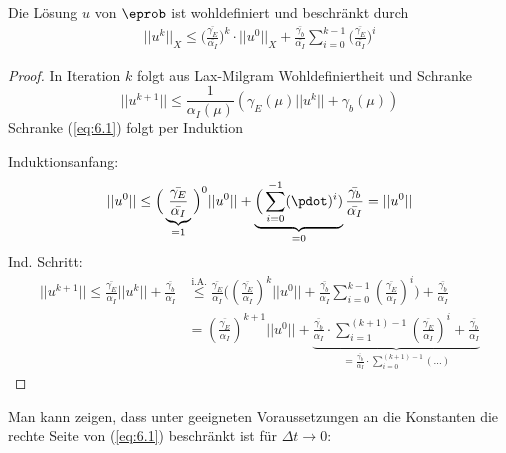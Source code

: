 \begin{satz} \label{6.2}
Die Lösung $u$ von $\eprob$ ist wohldefiniert und beschränkt durch
\begin{align} \label{eq:6.1}
||u^k||_X \leq \Big(\frac{\bar{\gamma_E}}{\bar{\alpha_I}}\Big)^k \cdot ||u^0||_X + \frac{\bar{\gamma_b}}{\bar{\alpha_I}} \sum\limits_{i=0}^{k-1} \Big(\frac{\bar{\gamma_E}}{\bar{\alpha_I}}\Big)^i
\end{align}
\begin{proof}
In Iteration $k$ folgt aus Lax-Milgram Wohldefiniertheit und Schranke
\[
	||u^{k+1}|| \leq \frac{1}{\alpha_I(\mu)} (\gamma_E(\mu)||u^k|| + \gamma_b(\mu))
\]
Schranke (\ref{eq:6.1}) folgt per Induktion

Induktionsanfang:
\[
	||u^0|| \leq \Big(\underbrace{\frac{\bar{\gamma_E}}{\bar{\alpha_I}}}_{=1}\Big)^0 ||u^0|| + \underbrace{\Big(\sum\limits_{i=0}^{-1}(\pdot)^i)}_{=0} \frac{\bar{\gamma_b}}{\bar{\alpha_I}} = ||u^0||
\]
Ind. Schritt:
\begin{align*}
	||u^{k+1}|| \leq \frac{\bar{\gamma_E}}{\alpha_I} ||u^k|| + \frac{\bar{\gamma_b}}{\alpha_I} &\overset{\text{i.A.}}{\leq} \frac{\bar{\gamma_E}}{\alpha_I} \Big((\frac{\bar{\gamma_E}}{\alpha_I})^k ||u^0|| + \frac{\bar{\gamma_b}}{\alpha_I} \sum\limits_{i=0}^{k-1} (\frac{\bar{\gamma_E}}{\alpha_I})^i\Big) + \frac{\bar{\gamma_b}}{\alpha_I} \\
	&=(\frac{\bar{\gamma_E}}{\alpha_I})^{k+1} ||u^0|| + \underbrace{\frac{\bar{\gamma_b}}{\alpha_I} \cdot \sum\limits_{i=1}^{(k+1)-1} (\frac{\bar{\gamma_E}}{\alpha_I})^i + \frac{\bar{\gamma_b}}{\alpha_I}}_{=\frac{\bar{\gamma_b}}{\alpha_I}\cdot \sum\limits_{i=0}^{(k+1)-1}(\dots)}
\end{align*}
\end{proof}
\end{satz}

Man kann zeigen, dass unter geeigneten Voraussetzungen an die Konstanten die rechte Seite von (\ref{eq:6.1}) beschränkt ist für $\Delta t \rightarrow 0$:

